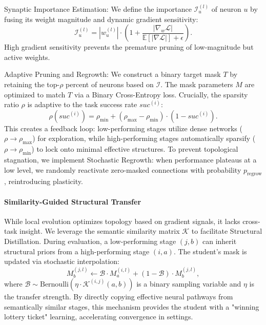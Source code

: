 \documentclass{article}
\begin{document}
Synaptic Importance Estimation:
We define the importance $\mathcal{I}^{(l)}_{u}$ of neuron $u$ by fusing its weight magnitude and dynamic gradient sensitivity:
\begin{equation}
\mathcal{I}^{(l)}_{u} = |w^{(l)}_{u}| \cdot \left(1 + \frac{|\nabla_{w} \mathcal{L}|}{\mathbb{E}[|\nabla \mathcal{L}|] + \epsilon}\right).
\end{equation}
High gradient sensitivity prevents the premature pruning of low-magnitude but active weights.

Adaptive Pruning and Regrowth:
We construct a binary target mask $T$ by retaining the top-$\rho$ percent of neurons based on $\mathcal{I}$. 
The mask parameters $M$ are optimized to match $T$ via a Binary Cross-Entropy loss. Crucially, the sparsity ratio $\rho$ is adaptive to the task success rate $suc^{(i)}$:
\begin{equation}
\rho(suc^{(i)}) = \rho_{\text{min}} + (\rho_{\text{max}} - \rho_{\text{min}}) \cdot (1 - suc^{(i)}).
\end{equation}
This creates a feedback loop: low-performing stages utilize dense networks ($\rho \to \rho_{\text{max}}$) for exploration, while high-performing stages automatically sparsify ($\rho \to \rho_{\text{min}}$) to lock onto minimal effective structures.
To prevent topological stagnation, we implement Stochastic Regrowth: when performance plateaus at a low level, we randomly reactivate zero-masked connections with probability $p_{\text{regrow}}$, reintroducing plasticity.

\paragraph{Similarity-Guided Structural Transfer}
While local evolution optimizes topology based on gradient signals, it lacks cross-task insight. We leverage the semantic similarity matrix $\mathcal{K}$ to facilitate Structural Distillation.
During evaluation, a low-performing stage $(j, b)$ can inherit structural priors from a high-performing stage $(i, a)$.
The student's mask is updated via stochastic interpolation:
\begin{equation}
M^{(j,l)}_{b} \leftarrow \mathcal{B} \cdot M^{(i,l)}_{a} + (1 - \mathcal{B}) \cdot M^{(j,l)}_{b},
\end{equation}
where $\mathcal{B} \sim \text{Bernoulli}(\eta \cdot \mathcal{K}^{(i,j)}{(a,b)})$ is a binary sampling variable and $\eta$ is the transfer strength.
By directly copying effective neural pathways from semantically similar stages, this mechanism provides the student with a "winning lottery ticket" learning, accelerating convergence in settings.
\end{document}
